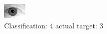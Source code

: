 \begin{figure}[h!]
\begin{center}
\includegraphics[width=0.60\columnwidth]{figures/ID2108_class_4_target_3.png}
\end{center}
\caption{ Classification: 4 actual target: 3}
\label{fig:ID2108_class_4_target_3}
\end{figure}

